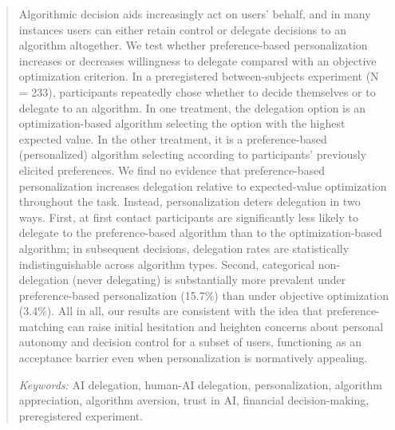 \documentclass[a4paper, 12pt, fleqn]{article}
\theoremstyle{definition}
\begin{document}
\begin{abstract}
  Algorithmic decision aids increasingly act on users’ behalf, and in many instances users can either retain control or delegate decisions to an algorithm altogether. We test whether preference-based personalization increases or decreases willingness to delegate compared with an objective optimization criterion. In a preregistered between-subjects experiment (N = 233), participants repeatedly chose whether to decide themselves or to delegate to an algorithm. In one treatment, the delegation option is an optimization-based algorithm selecting the option with the highest expected value. In the other treatment, it is a preference-based (personalized) algorithm selecting according to participants’ previously elicited preferences. We find no evidence that preference-based personalization increases delegation relative to expected-value optimization throughout the task. Instead, personalization deters delegation in two ways. First, at first contact participants are significantly less likely to delegate to the preference-based algorithm than to the optimization-based algorithm; in subsequent decisions, delegation rates are statistically indistinguishable across algorithm types. Second, categorical non-delegation (never delegating) is substantially more prevalent under preference-based personalization (15.7\%) than under objective optimization (3.4\%). 
  All in all, our results are consistent with the idea that preference-matching can raise initial hesitation and heighten concerns about personal autonomy and decision control for a subset of users, functioning as an acceptance barrier even when personalization is normatively appealing.
  
     \vspace{.25cm}
  \textit{Keywords:} {AI delegation, human-AI delegation, personalization, algorithm appreciation, algorithm aversion, trust in AI, financial decision-making, preregistered experiment.}\vspace{.15cm}
\end{abstract}
\vspace{-.5cm}
\newpage
\end{document}
